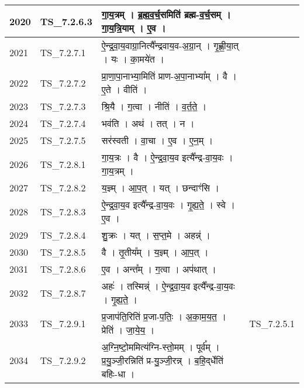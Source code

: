 \documentclass[17pt]{extarticle}
\begin{document}
\begin{longtable}{||p{0.4in}||p{0.9in}||p{4.0in}||p{0.9in}||}
        \hline
            2020 & TS\_7.2.6.3 & गा॒य॒त्रम्   ।   ब्र॒ह्म॒व॒र्च॒समिति॑ ब्रह्म{-}व॒र्च॒सम्   ।   गा॒य॒त्रि॒याम्   ।   ए॒व   ।    &      \\
        \hline
            2021 & TS\_7.2.7.1 & ऐ॒न्द्र॒वा॒य॒वाग्रा॒नित्यै᳚न्द्रवाय॒व{-}अ॒ग्रा॒न्   ।   गृ॒ह्णी॒या॒त्   ।   यः   ।   का॒मये॑त   ।    &      \\
        \hline
            2022 & TS\_7.2.7.2 & प्रा॒णा॒पा॒नाभ्या॒मिति॑ प्राण{-}अ॒पा॒नाभ्या᳚म्   ।   वै   ।   ए॒ते   ।   वीति॑   ।    &      \\
        \hline
            2023 & TS\_7.2.7.3 & श्रि॒यै   ।   ग॒त्वा   ।   नीति॑   ।   व॒र्त॒ते॒   ।    &      \\
        \hline
            2024 & TS\_7.2.7.4 & भव॑ति   ।   अथ॑   ।   तत्   ।   न   ।    &      \\
        \hline
            2025 & TS\_7.2.7.5 & सर॑स्वती   ।   वा॒चा   ।   ए॒व   ।   ए॒न॒म्   ।    &      \\
        \hline
            2026 & TS\_7.2.8.1 & गा॒य॒त्रः   ।   वै   ।   ऐ॒न्द्र॒वा॒य॒व इत्यै᳚न्द्र{-}वा॒य॒वः   ।   गा॒य॒त्रम्   ।    &      \\
        \hline
            2027 & TS\_7.2.8.2 & य॒ज्ञ्म्   ।   आ॒प॒त्   ।   यत्   ।   छन्दाꣳ॑सि   ।    &      \\
        \hline
            2028 & TS\_7.2.8.3 & ऐ॒न्द्र॒वा॒य॒व इत्यै᳚न्द्र{-}वा॒य॒वः   ।   गृ॒ह्य॒ते॒   ।   स्वे   ।   ए॒व   ।    &      \\
        \hline
            2029 & TS\_7.2.8.4 & शु॒क्रः   ।   यत्   ।   स॒प्त॒मे   ।   अहन्न्॑   ।    &      \\
        \hline
            2030 & TS\_7.2.8.5 & वै   ।   तृ॒तीय᳚म्   ।   य॒ज्ञ्म्   ।   आ॒प॒त्   ।    &      \\
        \hline
            2031 & TS\_7.2.8.6 & ए॒व   ।   अन्त᳚म्   ।   ग॒त्वा   ।   अप॑थात्   ।    &      \\
        \hline
            2032 & TS\_7.2.8.7 & अहः॑   ।   तस्मिन्न्॑   ।   ऐ॒न्द्र॒वा॒य॒व इत्यै᳚न्द्र{-}वा॒य॒वः   ।   गृ॒ह्य॒ते॒   ।    &      \\
        \hline
            2033 & TS\_7.2.9.1 & प्र॒जाप॑ति॒रिति॑ प्र॒जा{-}प॒तिः॒   ।   अ॒का॒म॒य॒त॒   ।   प्रेति॑   ।   जा॒ये॒य॒   ।    & TS\_7.2.5.1        \\
        \hline
            2034 & TS\_7.2.9.2 & अ॒ग्नि॒ष्टो॒ममित्य॑ग्नि{-}स्तो॒मम्   ।   पूर्व᳚म्   ।   प्र॒यु॒ञ्जी॒रन्निति॑ प्र{-}यु॒ञ्जी॒रन्न्   ।   ब॒हि॒द्‌र्धेति॑ बहिः{-}धा   ।    &      \\

\end{longtable}
\end{document}
